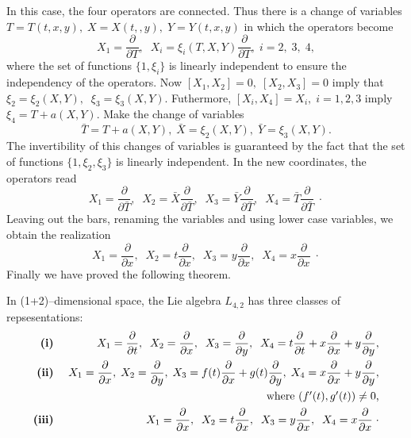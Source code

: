 In this case, the four operators are connected. Thus there is
a change of variables $T=T(t,x,y),\;X=X(t,,y),\;Y=Y(t,x,y)$ in which the
operators become
\[X_1=\frac{\partial}{\partial T},
\;\;X_i=\xi_{i}(T,X,Y)\frac{\partial}{\partial T},\;i=2,\;3,\;4,\]
where the set of functions $\{1,\xi_i\}$ is linearly independent to ensure
the independency of the operators. Now $[X_1,X_2]=0,\;[X_2,X_3]=0$ imply
that $\xi_2=\xi_2(X,Y),\;\;\xi_3=\xi_3(X,Y)$. Futhermore, $[X_i,X_4]=X_i,\; 
i=1,2,3$ imply  $\xi_4=T+a(X,Y)$. Make the change of variables
\[\bar T=T+a(X,Y),\;\bar X=\xi_2(X,Y),\; \bar Y=\xi_3 (X,Y).\]
The invertibility of this changes of variables is guaranteed by the fact that
the set of functions $\{1,\xi_2,\xi_3\}$ is linearly independent. In the new
coordinates, the operators read
\[X_1=\frac{\partial}{\partial \bar T},\;\;
X_2=\bar X \frac{\partial}{\partial \bar T},\;\;
X_3=\bar Y \frac{\partial}{\partial \bar T},\;\;
X_4=\bar T\frac{\partial}{\partial \bar T}\;\cdot\]
Leaving out the bars, renaming the variables and using lower case variables, we
obtain the realization
\begin{equation}
\label{ch6:eq13}
X_1=\frac{\partial}{\partial  x},\;\;
X_2=t \frac{\partial}{\partial x},\;\;
X_3=y \frac{\partial}{\partial x},\;\;
X_4=x \frac{\partial}{\partial x}\;\cdot
\end{equation}
Finally we have proved the following theorem.
\begin{theo}
\label{ch6:theo3}
\begin{em}
In (1+2)--dimensional space, the Lie algebra $L_{4,2}$ has three classes
of repsesentations:
\begin{eqnarray}
\mbox{{\bf (i)}  } & & X_1 = \frac{\partial}{\partial t},\;\;X_2=\frac{\partial}{\partial x},\;\; 
X_3=\frac{\partial}{\partial y},\;\;
X_4 = t\frac{\partial}{\partial t}+ x\frac{\partial}
{\partial x}+y\frac{\partial}{\partial y}, \label{ch6:eq14}\\
\mbox {{\bf (ii)}  } & & X_1 = \frac{\partial}{\partial x},\;
X_2=\frac{\partial}{\partial y},\; 
X_3=f(t)\frac{\partial}{\partial x}+g(t)\frac{\partial}{\partial y},\;
X_4 = x\frac{\partial}{\partial x}+y\frac{\partial}{\partial y}, \label{ch6:eq15}\\
 & & \mbox{where $(f'(t),g'(t))\ne 0$,}\nonumber\\
\mbox{{\bf (iii)}  } & & X_1=\frac{\partial}{\partial  x},\;\;
X_2=t \frac{\partial}{\partial x},\;\;
X_3=y \frac{\partial}{\partial x},\;\;
X_4=x \frac{\partial}{\partial x}\;\cdot \label{ch6:eq16}
\end{eqnarray}
\end{em}
\end{theo}
